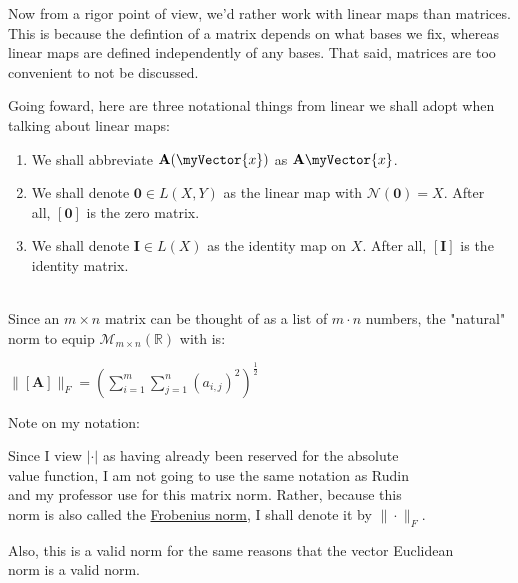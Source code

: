 \documentclass{book}
\newcommand{\myComment}{%
   \color{RawerSienna}%
   \fontsize{12}{14}\selectfont%
}
\newenvironment{myIndent}{%
   \begin{adjustwidth}{2.5em}{0em}%
}{%
   \end{adjustwidth}%
}
\newenvironment{myTindent}{%
   \begin{adjustwidth}{7.5em}{0em}%
}{%
   \end{adjustwidth}%
}
\newcommand{\nullSp}[1]{\mathscr{N}(#1)}
\newcommand{\mySepTwo}[1][.]{%
   {\noindent\color{#1}{\rule{6.5in}{0.5mm}}}\\%
}
\newcommand{\retTwo}{\hfill\bigbreak}
\newcommand{\mVec}[1]{\myVector{#1}}
\newcommand{\mMat}[1]{\mathbf{#1}}
\begin{document}
Now from a rigor point of view, we'd rather work with linear maps than matrices.\\ This is because the defintion of a matrix depends on what bases we fix, whereas\\ linear maps are defined independently of any bases. That said, matrices are too\\ convenient to not be discussed.\retTwo

Going foward, here are three notational things from linear we shall adopt when talking about linear maps:
\begin{enumerate}
   \item We shall abbreviate $\mMat{A}(\mVec{x})$ as $\mMat{A}\mVec{x}$.
   \item We shall denote $\mMat{0} \in L(X, Y)$ as the linear map with $\nullSp{\mMat{0}} = X$. After\\ all, $[\mMat{0}]$ is the zero matrix.
   \item We shall denote $\mMat{I} \in L(X)$ as the identity map on $X$. After all, $[\mMat{I}]$ is the\\ identity matrix.
\end{enumerate}

\mySepTwo

Since an $m\times n$ matrix can be thought of as a list of $m\cdot n$ numbers, the "natural" norm to equip $\mathcal{M}_{m\times n}(\mathbb{R})$ with is:\\ [-22pt]

{\centering $\|[\mMat{A}]\|_F = \left(\sum\limits_{i=1}^{m}\sum\limits_{j=1}^{n}(a_{i,j})^2\right)^{\frac{1}{2}}$\\[-2pt]\par}


{\begin{myTindent}\myComment
   Note on my notation:
   \begin{myIndent}
      Since I view $|\cdot|$ as having already been reserved for the absolute\\ value function, I am not going to use the same notation as Rudin\\ and my professor use for this matrix norm. Rather, because this\\ norm is also called the \ul{Frobenius norm}, I shall denote it by $\|\cdot\|_F$.\retTwo
   \end{myIndent}

   Also, this is a valid norm for the same reasons that the vector Euclidean\\ norm is a valid norm.\retTwo
\end{myTindent}}
\end{document}
